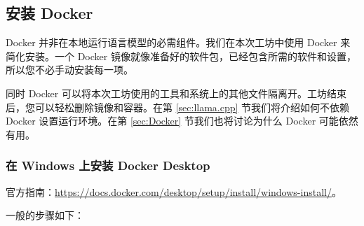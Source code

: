 \documentclass[a4paper,12pt]{article}
\begin{document}
\subsection{安装 Docker}

Docker 并非在本地运行语言模型的必需组件。我们在本次工坊中使用 Docker 来简化安装。一个 Docker 镜像就像准备好的软件包，已经包含所需的软件和设置，所以您不必手动安装每一项。

同时 Docker 可以将本次工坊使用的工具和系统上的其他文件隔离开。工坊结束后，您可以轻松删除镜像和容器。在第 \ref{sec:llama.cpp} 节我们将介绍如何不依赖 Docker 设置运行环境。在第 \ref{sec:Docker} 节我们也将讨论为什么 Docker 可能依然有用。

\subsubsection{在 Windows 上安装 Docker Desktop}

官方指南：\url{https://docs.docker.com/desktop/setup/install/windows-install/}。

一般的步骤如下：
\end{document}
